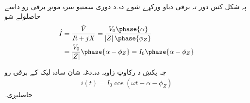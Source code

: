 پہ شکل   کښ   دور تہ  برقی دباو ورکړے شوے دہ۔د دوری سمتیو سرہ مونږ برقی رو داسے  حاصلولے شو
\begin{gather}
\begin{aligned}
\hat{I}&=\frac{\hat{V}}{R+j X}=\frac{V_0 \phase{\alpha}}{\abs{Z} \phase {\phi_Z}}\\
&=\frac{V_0}{\abs{Z}} \phase{\alpha-\phi_Z}=I_0 \phase{\alpha-\phi_Z}
\end{aligned}
\end{gather}
 
چہ  پکښ د رکاوټ زاویہ دہ۔دغہ شان سادہ لیک کے برقی رو 
\begin{align}\label{مساوات_بنیادی_حقائق_دوری_سمتیہ_سے_مزاحمت_امالہ_دور_حل}
i(t)=I_0 \cos (\omega t +\alpha-\phi_Z)
\end{align}
حاصلیږی۔
 


